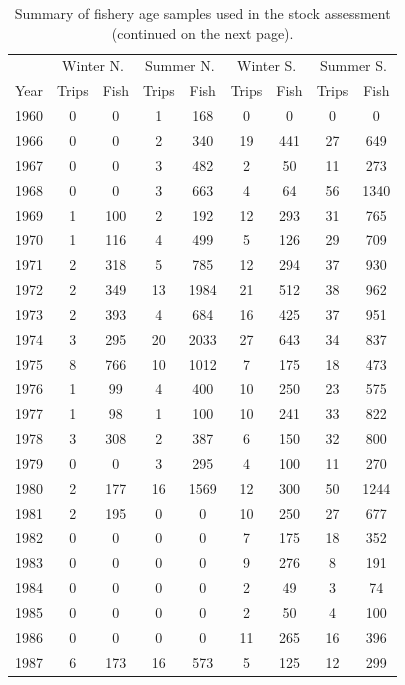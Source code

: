 \documentclass[12pt,]{article}
\begin{document}
\begin{longtable}{ccccccccc}
\caption{Summary of fishery age samples used in the stock assessment (continued on the next page).} \\ 
  \hline
   & \multicolumn{2}{c}{Winter N.} &  \multicolumn{2}{c}{Summer N.} & \multicolumn{2}{c}{Winter S.} & \multicolumn{2}{c}{Summer S.} \\
 Year & Trips & Fish & Trips & Fish & Trips & Fish & Trips & Fish \\
 \hline
1960 & 0 & 0 & 1 & 168 & 0 & 0 & 0 & 0 \\ 
  1966 & 0 & 0 & 2 & 340 & 19 & 441 & 27 & 649 \\ 
  1967 & 0 & 0 & 3 & 482 & 2 & 50 & 11 & 273 \\ 
  1968 & 0 & 0 & 3 & 663 & 4 & 64 & 56 & 1340 \\ 
  1969 & 1 & 100 & 2 & 192 & 12 & 293 & 31 & 765 \\ 
  1970 & 1 & 116 & 4 & 499 & 5 & 126 & 29 & 709 \\ 
  1971 & 2 & 318 & 5 & 785 & 12 & 294 & 37 & 930 \\ 
  1972 & 2 & 349 & 13 & 1984 & 21 & 512 & 38 & 962 \\ 
  1973 & 2 & 393 & 4 & 684 & 16 & 425 & 37 & 951 \\ 
  1974 & 3 & 295 & 20 & 2033 & 27 & 643 & 34 & 837 \\ 
  1975 & 8 & 766 & 10 & 1012 & 7 & 175 & 18 & 473 \\ 
  1976 & 1 & 99 & 4 & 400 & 10 & 250 & 23 & 575 \\ 
  1977 & 1 & 98 & 1 & 100 & 10 & 241 & 33 & 822 \\ 
  1978 & 3 & 308 & 2 & 387 & 6 & 150 & 32 & 800 \\ 
  1979 & 0 & 0 & 3 & 295 & 4 & 100 & 11 & 270 \\ 
  1980 & 2 & 177 & 16 & 1569 & 12 & 300 & 50 & 1244 \\ 
  1981 & 2 & 195 & 0 & 0 & 10 & 250 & 27 & 677 \\ 
  1982 & 0 & 0 & 0 & 0 & 7 & 175 & 18 & 352 \\ 
  1983 & 0 & 0 & 0 & 0 & 9 & 276 & 8 & 191 \\ 
  1984 & 0 & 0 & 0 & 0 & 2 & 49 & 3 & 74 \\ 
  1985 & 0 & 0 & 0 & 0 & 2 & 50 & 4 & 100 \\ 
  1986 & 0 & 0 & 0 & 0 & 11 & 265 & 16 & 396 \\ 
  1987 & 6 & 173 & 16 & 573 & 5 & 125 & 12 & 299 \\ 

\end{longtable}
\end{document}
